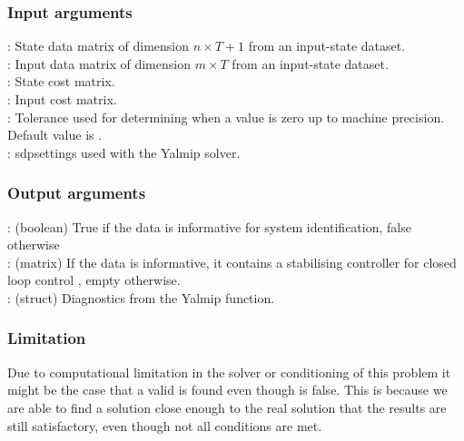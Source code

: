 \subsubsection*{Input arguments}
\textbf{}: State data matrix of dimension $n \times T+1$ from an input-state dataset.\\
\textbf{}: Input data matrix of dimension $m \times T$ from an input-state dataset.\\
\textbf{}: State cost matrix.\\
\textbf{}: Input cost matrix.\\
\textbf{}: Tolerance used for determining when a value is zero up to machine precision. Default value is .\\
\textbf{}: sdpsettings used with the Yalmip solver.

\subsubsection*{Output arguments}
\textbf{}: (boolean) True if the data is informative for system identification, false otherwise\\
\textbf{}: (matrix) If the data is informative, it contains a stabilising controller  for closed loop control , empty otherwise.\\
\textbf{}: (struct) Diagnostics from the Yalmip  function.

\subsubsection*{Limitation}
Due to computational limitation in the solver or conditioning of this problem it might be the case that a valid  is found even though  is false. This is because we are able to find a solution close enough to the real solution that the results are still satisfactory, even though not all conditions are met. 

